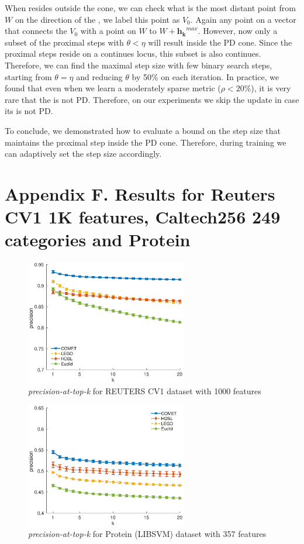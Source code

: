 \documentclass[twoside,11pt]{article}
\newcommand\mat[1]{{#1}}
\renewcommand\vec[1]{\mathbf{#1}}
\newcommand{\W}{\mat{W}}
\newcommand{\hk}{\vec{h_k}}
\begin{document}
When \Vkorigin resides outside the cone, we can check what is the most distant point from $\W$ on the direction of the \Vkorigin, we label this point as $V_0$. Again any point on a vector that connects the $V_0$ with a point on $\W$ to $\W + \hk^{max}$. However, now only a subset of the proximal steps with $\theta < \eta$ will result inside the PD cone. Since the proximal steps reside on a continues locus, this subset is also continues. Therefore, we can find the maximal step size with few binary search steps, starting from $\theta = \eta$ and reducing $\theta$ by 50\% on each iteration. In practice, we found that even when we learn a moderately sparse metric ($\rho <20\%$), it is very rare that the \Vkorigin is not PD. Therefore, on our experiments we skip the update in case its \Vkorigin is not PD.

To conclude, we demonstrated how to evaluate a bound on the step size that maintains the proximal step inside the PD cone. Therefore, during training we can adaptively set the step size accordingly. 

\section*{Appendix F. Results for Reuters CV1 1K features, Caltech256 249 categories and Protein}

\begin{figure}[h]
\centering
\includegraphics[width=7cm]{precision@k_rcv1_4_ig1000}
\captionsetup{font=small}
\caption*{\textit{precision-at-top-k} for REUTERS CV1 dataset with 1000 features}

\end{figure}

\begin{figure}[h]
\centering
\includegraphics[width=7cm]{precision@k_protein}
\captionsetup{font=small}
\caption*{\textit{precision-at-top-k} for Protein (LIBSVM) dataset with 357 features}
\end{figure}
\end{document}

